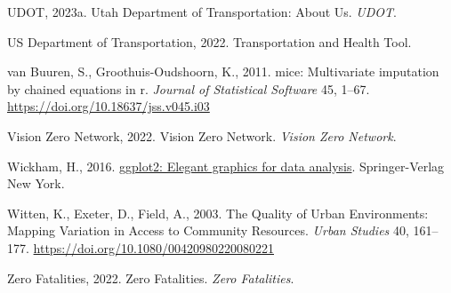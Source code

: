 \documentclass[
  letterpaper,
  DIV=11,
  numbers=noendperiod]{scrreport}
\newlength{\cslhangindent}
\newlength{\cslentryspacingunit} %
\newenvironment{CSLReferences}[2] %
 {%
  \setlength{\parindent}{0pt}
  \ifodd #1
  \let\oldpar\par
  \def\par{\hangindent=\cslhangindent\oldpar}
  \fi
  \setlength{\parskip}{#2\cslentryspacingunit}
 }%
 {}
\begin{document}
\begin{CSLReferences}{1}{0}
\leavevmode{}%
UDOT, 2023a. Utah {Department} of {Transportation}: {About Us}.
\emph{UDOT}.

\leavevmode{}%
US Department of Transportation, 2022. Transportation and {Health Tool}.

\leavevmode{}%
van Buuren, S., Groothuis-Oudshoorn, K., 2011. {mice}: Multivariate
imputation by chained equations in r. \emph{Journal of Statistical
Software} 45, 1--67. \url{https://doi.org/10.18637/jss.v045.i03}

\leavevmode{}%
Vision Zero Network, 2022. Vision {Zero Network}. \emph{Vision Zero
Network}.

\leavevmode{}%
Wickham, H., 2016. \href{https://ggplot2.tidyverse.org}{ggplot2: Elegant
graphics for data analysis}. Springer-Verlag New York.

\leavevmode{}%
Witten, K., Exeter, D., Field, A., 2003. The {Quality} of {Urban
Environments}: {Mapping Variation} in {Access} to {Community Resources}.
\emph{Urban Studies} 40, 161--177.
\url{https://doi.org/10.1080/00420980220080221}

\leavevmode{}%
Zero Fatalities, 2022. Zero {Fatalities}. \emph{Zero Fatalities}.

\end{CSLReferences}
\end{document}
